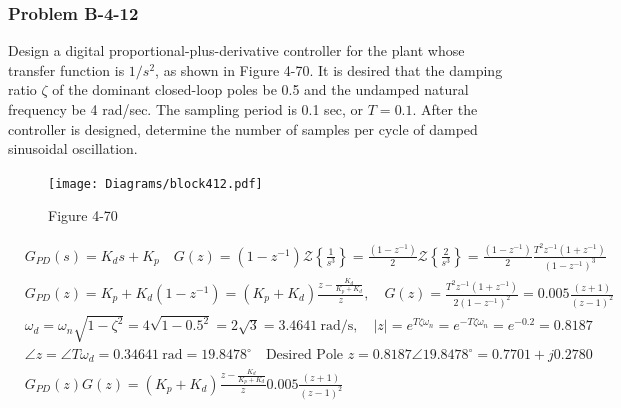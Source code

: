 {\subsubsection*{Problem B-4-12}
Design a digital proportional-plus-derivative controller for the plant whose transfer function is $1/s^2$, as shown in Figure 4-70. It is desired that the damping ratio $\zeta$ of the dominant closed-loop poles be 0.5 and the undamped natural frequency be 4 rad/sec. The sampling period is 0.1 sec, or $T=0.1$. After the controller is designed, determine the number of samples per cycle of damped sinusoidal oscillation.
\begin{figure}
	\centering
	\texttt{[image: Diagrams/block412.pdf]}
	\caption*{Figure 4-70}
	\label{fig:blockB4-12}
\end{figure}
\vspace*{-1.05cm}
\begin{align}
&  G_{PD}(s) = K_ds +K_p \quad G(z) = (1-z^{-1}) \mathcal{Z} \left\{\frac{1}{s^3} \right\} = \frac{(1-z^{-1})}{2} \mathcal{Z} \left\{\frac{2}{s^3} \right\} = \frac{(1-z^{-1})}{2} \frac{T^2z^{-1}(1+z^{-1})}{(1-z^{-1})^3} \\
& G_{PD}(z) =K_p+K_d(1-z^{-1})= (K_p+K_d)\frac{z-\frac{K_d}{K_p+K_d}}{z}, \quad G(z)=\frac{T^2z^{-1}(1+z^{-1})}{2(1-z^{-1})^2}=0.005\frac{(z+1)}{(z-1)^2} \\
& \omega_d = \omega_n \sqrt{1-\zeta^2} = 4 \sqrt{1-0.5^2}= 2 \sqrt{3} =3.4641 \ \text{rad/s}, \quad |z| = e^{T \zeta \omega_n} = e^{-T \zeta \omega_n} =e^{-0.2} = 0.8187 \\
& \angle z = \angle T \omega_d = 0.34641 \ \text{rad} =19.8478^\circ \quad  \text{Desired Pole } z = 0.8187 \angle 19.8478^\circ =0.7701+j0.2780 \\
& G_{PD}(z)G(z)= (K_p+K_d)\frac{z-\frac{K_d}{K_p+K_d}}{z}0.005\frac{(z+1)}{(z-1)^2}
\end{align}

}

